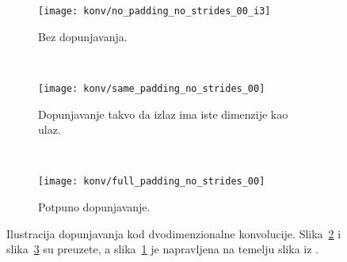 \documentclass[utf8, diplomski, lmodern]{fer}
\begin{document}
\begin{figure}
	\centering
	\begin{subfigure}[t]{0.31\textwidth}
		\texttt{[image: konv/no\_padding\_no\_strides\_00\_i3]}
		\caption{Bez dopunjavanja.}
		\label{subfig:konv-nopad}
	\end{subfigure}
	~
	\begin{subfigure}[t]{0.31\textwidth}
		\centering
		\texttt{[image: konv/same\_padding\_no\_strides\_00]}
		\caption{Dopunjavanje takvo da izlaz ima iste dimenzije kao ulaz.}
		\label{subfig:konv-samepad}
	\end{subfigure}
	~
	\begin{subfigure}[t]{0.31\textwidth}
		\centering
		\texttt{[image: konv/full\_padding\_no\_strides\_00]}
		\caption{Potpuno dopunjavanje.}
		\label{subfig:konv-fullpad}
	\end{subfigure}
	\caption{Ilustracija dopunjavanja kod dvodimenzionalne konvolucije. Slika~\ref{subfig:konv-samepad} i slika~\ref{subfig:konv-fullpad} su preuzete, a slika~\ref{subfig:konv-nopad} je napravljena na temelju slika iz \citet{Dumoulin:2016:GCADL}.}
	\label{fig:konvolucija-dopunjavanje}
\end{figure}
\end{document}
